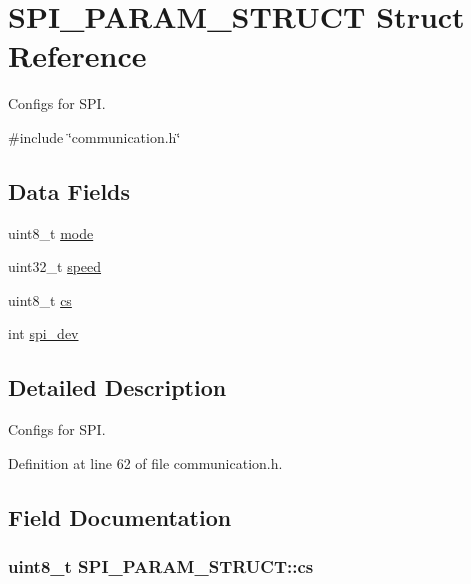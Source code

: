 \hypertarget{structSPI__PARAM__STRUCT}{\section{S\-P\-I\-\_\-\-P\-A\-R\-A\-M\-\_\-\-S\-T\-R\-U\-C\-T Struct Reference}
\label{structSPI__PARAM__STRUCT}
}


Configs for S\-P\-I.  




{\ttfamily \#include \char`\"{}communication.\-h\char`\"{}}

\subsection*{Data Fields}
\begin{DoxyCompactItemize}
\item 
uint8\-\_\-t \hyperlink{structSPI__PARAM__STRUCT_a82c546c99f6c3daed73c1e23426be847}{mode}
\item 
uint32\-\_\-t \hyperlink{structSPI__PARAM__STRUCT_a53a8d386594a81eb9bc6f971bfe36c54}{speed}
\item 
uint8\-\_\-t \hyperlink{structSPI__PARAM__STRUCT_ae0d62e0a5554783d710b677a017e246f}{cs}
\item 
int \hyperlink{structSPI__PARAM__STRUCT_abe385c44333d268d17cf648c8e371cad}{spi\-\_\-dev}
\end{DoxyCompactItemize}


\subsection{Detailed Description}
Configs for S\-P\-I. 

Definition at line 62 of file communication.\-h.



\subsection{Field Documentation}
\hypertarget{structSPI__PARAM__STRUCT_ae0d62e0a5554783d710b677a017e246f}{
\subsubsection[{cs}]{\setlength{\rightskip}{0pt plus 5cm}uint8\-\_\-t S\-P\-I\-\_\-\-P\-A\-R\-A\-M\-\_\-\-S\-T\-R\-U\-C\-T\-::cs}}\label{structSPI__PARAM__STRUCT_ae0d62e0a5554783d710b677a017e246f}


